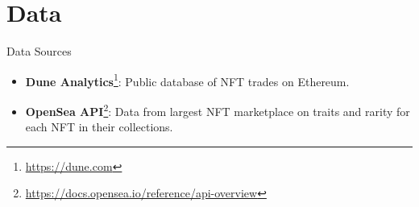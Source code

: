 \documentclass{beamer}
\begin{document}
\section{Data}
\begin{frame}{Data Sources}
    \begin{itemize}
        \item \textbf{Dune Analytics}\footnote{\url{https://dune.com}}: Public database of NFT trades on Ethereum.
        \item \textbf{OpenSea API}\footnote{\url{https://docs.opensea.io/reference/api-overview}}: Data from largest NFT marketplace on traits and rarity for each NFT in their collections.
    \end{itemize}

\end{frame}
\end{document}
